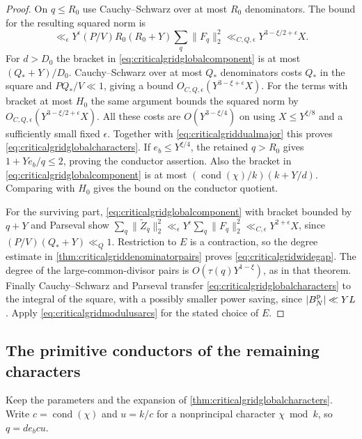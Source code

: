 \documentclass[11pt,a4paper]{article}
\numberwithin{equation}{section}
\begin{document}
\begin{proof}
On $q\le R_0$ use Cauchy--Schwarz over at most $R_0$ denominators.
The bound for the resulting squared norm is
\[
 \ll_\epsilon Y^\epsilon (P/V)R_0(R_0+Y)\sum_q\|F_q\|_2^2
 \ll_{C,Q,\epsilon} Y^{3-\xi/2+\epsilon}X .
\]
For $d>D_0$ the bracket in
\cref{eq:criticalgridglobalcomponent} is at most
$(Q_*+Y)/D_0$. Cauchy--Schwarz over at most $Q_*$
denominators costs $Q_*$ in the square and
$P Q_*/V\ll1$, giving a bound
$O_{C,Q,\epsilon}(Y^{3-\xi+\epsilon}X)$.
For the terms with bracket at most $H_0$ the same
argument bounds the squared norm by
$O_{C,Q,\epsilon}(Y^{3-\xi/2+\epsilon}X)$.
All these costs are $O(Y^{3-\xi/4})$ on using $X\le Y^{\xi/8}$
and a sufficiently small fixed $\epsilon$.
Together with \cref{eq:criticalgriddualmajor} this proves
\cref{eq:criticalgridglobalcharacters}. If $e_b\le Y^{\xi/4}$,
the retained $q>R_0$ gives $1+Y e_b/q\le2$, proving
the conductor assertion.
Also the bracket in \cref{eq:criticalgridglobalcomponent}
is at most $(\operatorname{cond}(\chi)/k)(k+Y/d)$.
Comparing with $H_0$ gives the bound on the conductor quotient.

For the surviving part, \cref{eq:criticalgridglobalcomponent}
with bracket bounded by $q+Y$ and Parseval show
$\sum_q\|\widetilde Z_q\|_2^2
\ll_\epsilon Y^\epsilon\sum_q\|F_q\|_2^2
\ll_{C,\epsilon}Y^{2+\epsilon}X$,
since $(P/V)(Q_*+Y)\ll_Q1$. Restriction to $E$
is a contraction, so the degree estimate in
\cref{thm:criticalgriddenominatorpairs} proves
\cref{eq:criticalgridwidegap}. The degree of the
large-common-divisor pairs is $O(\tau(q)Y^{1-\xi})$,
as in that theorem. Finally Cauchy--Schwarz and Parseval
transfer \cref{eq:criticalgridglobalcharacters} to the
integral of the square, with a possibly smaller power saving,
since $|B_N^{\rm p}|\ll YL$. Apply
\cref{eq:criticalgridmodulusarcs} for the stated choice of $E$.
\end{proof}

\clearpage
\subsection{The primitive conductors of the remaining characters}

Keep the parameters and the expansion of
\cref{thm:criticalgridglobalcharacters}. Write
$c=\operatorname{cond}(\chi)$ and $u=k/c$ for a
nonprincipal character $\chi\bmod k$, so $q=d e_b c u$.
\end{document}
